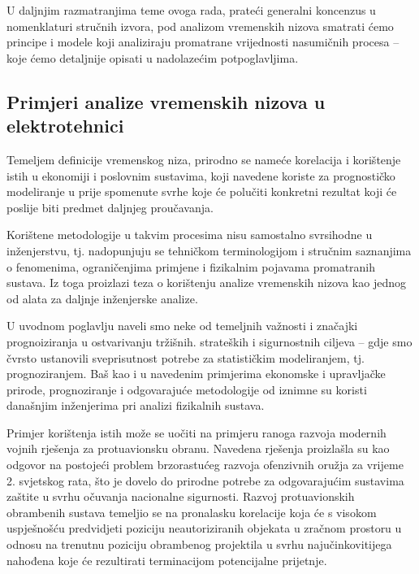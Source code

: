 \documentclass[a4paper,12pt,oneside]{memoir}
\begin{document}
            U daljnjim razmatranjima teme ovoga rada, prateći generalni koncenzus u nomenklaturi stručnih izvora, pod analizom vremenskih nizova smatrati ćemo principe i modele koji analiziraju promatrane vrijednosti nasumičnih procesa -- koje ćemo detaljnije opisati u nadolazećim potpoglavljima.

        \subsection{Primjeri analize vremenskih nizova u elektrotehnici}
            Temeljem definicije vremenskog niza, prirodno se nameće korelacija i korištenje istih u ekonomiji i poslovnim sustavima, koji navedene koriste za prognostičko modeliranje u prije spomenute svrhe koje će polučiti konkretni rezultat koji će poslije biti predmet daljnjeg proučavanja.

            Korištene metodologije u takvim procesima nisu samostalno svrsihodne u inženjerstvu, tj. nadopunjuju se tehničkom terminologijom i stručnim saznanjima o fenomenima, ograničenjima primjene i fizikalnim pojavama promatranih sustava. Iz toga proizlazi teza o korištenju analize vremenskih nizova kao jednog od alata za daljnje inženjerske analize.


            U uvodnom poglavlju naveli smo neke od temeljnih važnosti i značajki prognoiziranja u ostvarivanju tržišnih. strateških i sigurnostnih ciljeva -- gdje smo čvrsto ustanovili sveprisutnost potrebe za statističkim modeliranjem, tj. prognoziranjem. Baš kao i u navedenim primjerima ekonomske i upravljačke prirode, prognoziranje i odgovarajuće metodologije od iznimne su koristi današnjim inženjerima pri analizi fizikalnih sustava. 
            
            Primjer korištenja istih može se uočiti na primjeru ranoga razvoja modernih vojnih rješenja za protuavionsku obranu. Navedena rješenja proizlašla su kao odgovor na postojeći problem brzorastućeg razvoja ofenzivnih oružja za vrijeme 2. svjetskog rata, što je dovelo do prirodne potrebe za odgovarajućim sustavima zaštite u svrhu očuvanja nacionalne  sigurnosti. Razvoj protuavionskih obrambenih sustava temeljio se na pronalasku korelacije koja će s visokom uspješnošću predvidjeti poziciju neautoriziranih objekata u zračnom prostoru u odnosu na trenutnu poziciju obrambenog projektila u svrhu najučinkovitijega nahođena koje će rezultirati terminacijom potencijalne prijetnje.
            
\end{document}

